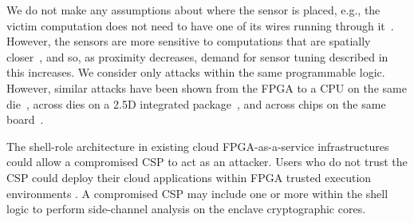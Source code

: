We do not make any assumptions about where the sensor is placed, e.g., the victim computation does not need to have one of its wires running through it~\cite{provelengios2019characterizing,giechaskiel2018leaky, ramesh2018fpga}. However, the sensors are more sensitive to computations that are spatially closer~\cite{provelengios2019characterizing, krautter2020cpamap}, and so, as proximity decreases, demand for sensor tuning described in this increases. We consider only attacks within the same programmable logic. However, similar attacks have been shown from the FPGA to a CPU on the same die~\cite{zhao2018fpga}, across dies on a 2.5D integrated package~\cite{giechaskiel2019reading}, and across chips on the same board~\cite{schellenberg2018remote, giechaskiel2020c3apsule}. %

The shell-role architecture in existing cloud FPGA-as-a-service infrastructures could allow a compromised CSP to act as an attacker. Users who do not trust the CSP could deploy their cloud applications within FPGA trusted execution environments \cite{zhao2022shef}. A compromised CSP may include one or more \sensors within the shell logic to perform side-channel analysis on the enclave cryptographic cores.


